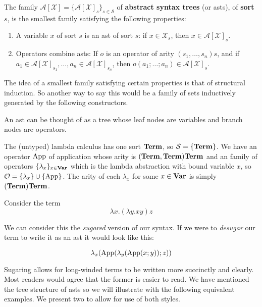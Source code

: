 \begin{defin}
    The family $\mathcal{A}[\mathcal{X}]=\{ \mathcal{A}[\mathcal{X}]_s \}_{s \in \mathcal{S}}$ of \textbf{abstract syntax trees} (or asts), of \textbf{sort} $s$, is the smallest family satisfying the following properties:
    
    \begin{enumerate}
        \item A variable $x$ of sort $s$ is an ast of sort $s$: if $x \in \mathcal{X}_s$, then $x \in \mathcal{A}[\mathcal{X}]_s$.
        
        \item Operators combine asts: If $o$ is an operator of arity $(s_1, \dots, s_n)s$, and if $a_1 \in \mathcal{A}[\mathcal{X}]_{s_1}, \dots, a_n \in \mathcal{A}[\mathcal{X}]_{s_n}$, then $o(a_1;\dots; a_n) \in \mathcal{A}[\mathcal{X}]_s$.
    \end{enumerate}
\end{defin}

\begin{remark}
    The idea of a smallest family satisfying certain properties is that of structural induction. So another way to say this would be a family of sets inductively generated by the following constructors.
\end{remark}

\begin{remark}
    An ast can be thought of as a tree whose leaf nodes are variables and branch nodes are operators. 
\end{remark}

\begin{example}
    The (untyped) lambda calculus has one sort $\mathbf{Term}$, so $\mathcal{S} = \{ \mathbf{Term} \} $. We have an operator $\mathrm{App}$ of application whose arity is $(\mathbf{Term}, \mathbf{Term})\mathbf{Term}$ and an family of operators $\{\lambda_x \}_{x \in \mathbf{Var}}$ which is the lambda abstraction with bound variable $x$, so $\mathcal{O} = \{ \lambda_x \} \cup \{ \mathrm{App} \} $. The arity of each $\lambda_x$ for some $x \in \mathbf{Var}$ is simply $(\mathbf{Term}) \mathbf{Term}$.
    
    Consider the term $$\lambda x . (\lambda y . x y)  z$$

    We can consider this the \textit{sugared} version of our syntax. If we were to \textit{desugar} our term to write it as an ast it would look like this:

    $$
        \lambda_x(\mathrm{App}(\lambda_y(\mathrm{App}(x ; y)); z) )
    $$

    Sugaring allows for long-winded terms to be written more succinctly and clearly. Most readers would agree that the former is easier to read. We have mentioned the tree structure of asts so we will illustrate with the following equivalent examples. We present two to allow for use of both styles.
    
    
    
\end{example}

